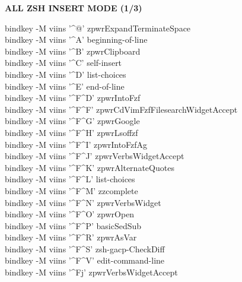 \documentclass[11pt,a4paper,twoside]{book}
\begin{document}
\vspace{10pt}
{\large\bfseries\color{neoncyan} ALL ZSH INSERT MODE (1/3)}\vspace{6pt}

bindkey -M viins '\textasciicircum{}@' zpwrExpandTerminateSpace\\
bindkey -M viins '\textasciicircum{}A' beginning-of-line\\
bindkey -M viins '\textasciicircum{}B' zpwrClipboard\\
bindkey -M viins '\textasciicircum{}C' self-insert\\
bindkey -M viins '\textasciicircum{}D' list-choices\\
bindkey -M viins '\textasciicircum{}E' end-of-line\\
bindkey -M viins '\textasciicircum{}F\textasciicircum{}D' zpwrIntoFzf\\
bindkey -M viins '\textasciicircum{}F\textasciicircum{}F' zpwrCdVimFzfFilesearchWidgetAccept\\
bindkey -M viins '\textasciicircum{}F\textasciicircum{}G' zpwrGoogle\\
bindkey -M viins '\textasciicircum{}F\textasciicircum{}H' zpwrLsoffzf\\
bindkey -M viins '\textasciicircum{}F\textasciicircum{}I' zpwrIntoFzfAg\\
bindkey -M viins '\textasciicircum{}F\textasciicircum{}J' zpwrVerbsWidgetAccept\\
bindkey -M viins '\textasciicircum{}F\textasciicircum{}K' zpwrAlternateQuotes\\
bindkey -M viins '\textasciicircum{}F\textasciicircum{}L' list-choices\\
bindkey -M viins '\textasciicircum{}F\textasciicircum{}M' zzcomplete\\
bindkey -M viins '\textasciicircum{}F\textasciicircum{}N' zpwrVerbsWidget\\
bindkey -M viins '\textasciicircum{}F\textasciicircum{}O' zpwrOpen\\
bindkey -M viins '\textasciicircum{}F\textasciicircum{}P' basicSedSub\\
bindkey -M viins '\textasciicircum{}F\textasciicircum{}R' zpwrAsVar\\
bindkey -M viins '\textasciicircum{}F\textasciicircum{}S' zsh-gacp-CheckDiff\\
bindkey -M viins '\textasciicircum{}F\textasciicircum{}V' edit-command-line\\
bindkey -M viins '\textasciicircum{}Fj' zpwrVerbsWidgetAccept\\
\end{document}
